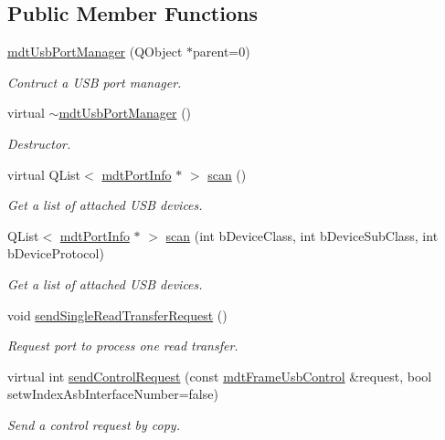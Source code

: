 \subsection*{Public Member Functions}
\begin{DoxyCompactItemize}
\item 
\hyperlink{classmdt_usb_port_manager_a7f82574e84d0a99d1c8bef7fd79283e3}{mdtUsbPortManager} (QObject $\ast$parent=0)
\begin{DoxyCompactList}\small\item\em Contruct a USB port manager. \end{DoxyCompactList}\item 
virtual \hyperlink{classmdt_usb_port_manager_ac0da1cf62e664b78fe91b873da5835ce}{$\sim$mdtUsbPortManager} ()
\begin{DoxyCompactList}\small\item\em Destructor. \end{DoxyCompactList}\item 
virtual QList$<$ \hyperlink{classmdt_port_info}{mdtPortInfo} $\ast$ $>$ \hyperlink{classmdt_usb_port_manager_a3a2370c3a2d0353a880bf9b777728c3b}{scan} ()
\begin{DoxyCompactList}\small\item\em Get a list of attached USB devices. \end{DoxyCompactList}\item 
QList$<$ \hyperlink{classmdt_port_info}{mdtPortInfo} $\ast$ $>$ \hyperlink{classmdt_usb_port_manager_ab28253c46c80bb12cbbd116b05c4bcd3}{scan} (int bDeviceClass, int bDeviceSubClass, int bDeviceProtocol)
\begin{DoxyCompactList}\small\item\em Get a list of attached USB devices. \end{DoxyCompactList}\item 
void \hyperlink{classmdt_usb_port_manager_a9bdfe328351a532f193f3f0a25caeaa9}{sendSingleReadTransferRequest} ()
\begin{DoxyCompactList}\small\item\em Request port to process one read transfer. \end{DoxyCompactList}\item 
virtual int \hyperlink{classmdt_usb_port_manager_aea4a67550effcba13acfc110d6d30c3e}{sendControlRequest} (const \hyperlink{classmdt_frame_usb_control}{mdtFrameUsbControl} \&request, bool setwIndexAsbInterfaceNumber=false)
\begin{DoxyCompactList}\small\item\em Send a control request by copy. \end{DoxyCompactList}\item 

\end{DoxyCompactItemize}
